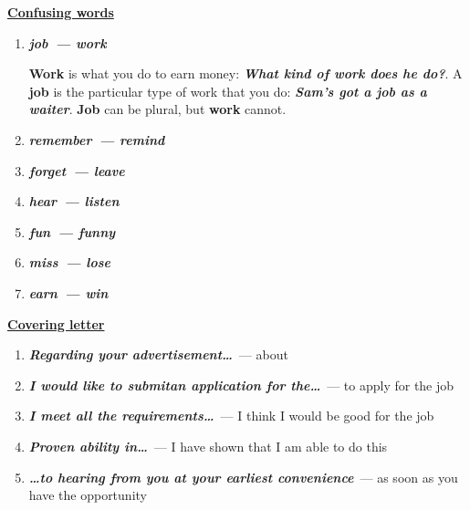 \documentclass[10pt,a4paper]{article}
\begin{document}
\textbf{\underline{Confusing words}}
\begin{enumerate}
  \item \textit{\textbf{job~--- work}}
  
  \textbf{Work} is what you do to earn money: \textit{\textbf{What kind of work does he do?}}. A \textbf{job} is the particular type of work that you do: \textit{\textbf{Sam's got a job as a waiter}}. \textbf{Job} can be plural, but \textbf{work} cannot.
  \item \textit{\textbf{remember~--- remind}}
  \item \textit{\textbf{forget~--- leave}}
  \item \textit{\textbf{hear~--- listen}}
  \item \textit{\textbf{fun~--- funny}}
  \item \textit{\textbf{miss~--- lose}}
  \item \textit{\textbf{earn~--- win}}
\end{enumerate}

\par\medskip\textbf{\underline{Covering letter}}
\begin{enumerate}
  \item \textit{\textbf{Regarding your advertisement\dots}}~--- about
  \item \textit{\textbf{I would like to submitan application for the\dots}}~--- to apply for the job
  \item \textit{\textbf{I meet all the requirements\dots}}~--- I think I would be good for the job
  \item \textit{\textbf{Proven ability in\dots}}~--- I have shown that I am able to do this
  \item \textit{\textbf{\dots to hearing from you at your earliest convenience}}~--- as soon as you have the opportunity
\end{enumerate}
\end{document}
